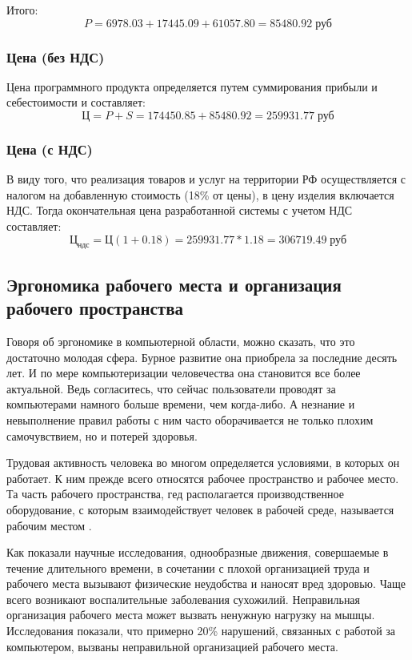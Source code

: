 \documentclass[russian,utf8,emptystyle]{eskdtext}
\begin{document}
\begin{spacing}{1.5}
Итого:
$$
P = 6978.03 + 17445.09 + 61057.80 = 85480.92 \; \text{руб}
$$

\subsubsection{Цена (без НДС)}
Цена программного продукта определяется путем суммирования прибыли и себестоимости и составляет: 
$$
\text{Ц} = P + S = 174450.85 + 85480.92 = 259931.77  \; \text{руб}
$$

\subsubsection{Цена (с НДС)}
В виду того, что реализация товаров и услуг на территории РФ осуществляется с налогом на добавленную стоимость (18\% от цены), в цену изделия включается НДС. Тогда окончательная цена разработанной системы с учетом НДС составляет:
$$
\text{Ц}_\text{ндс} = \text{Ц}(1 + 0.18) = 259931.77*1.18 = 306719.49 \; \text{руб}
$$

\subsection{Эргономика рабочего места и организация рабочего пространства}
Говоря об эргономике в компьютерной области, можно сказать, что это достаточно молодая сфера. Бурное развитие она приобрела за последние десять лет. И по мере компьютеризации человечества она становится все более актуальной. Ведь согласитесь, что сейчас пользователи проводят за компьютерами намного больше времени, чем когда-либо. А незнание и невыполнение правил работы с ним часто оборачивается не только плохим самочувствием, но и потерей здоровья. 

Трудовая активность человека во многом определяется условиями, в которых он работает. К ним прежде всего относятся рабочее пространство и рабочее место. Та часть рабочего пространства, гед располагается производственное оборудование, с которым взаимодействует человек в рабочей среде, называется рабочим местом \cite{Ergonomic}.

Как показали научные исследования, однообразные движения, совершаемые в течение длительного времени, в сочетании с плохой организацией труда и рабочего места вызывают физические неудобства и наносят вред здоровью. Чаще всего возникают воспалительные заболевания сухожилий. 
Неправильная организация рабочего места может вызвать ненужную нагрузку на мышцы. Исследования показали, что примерно 20\% нарушений, связанных с работой за компьютером, вызваны неправильной организацией рабочего места. 


\end{spacing}
\end{document}
